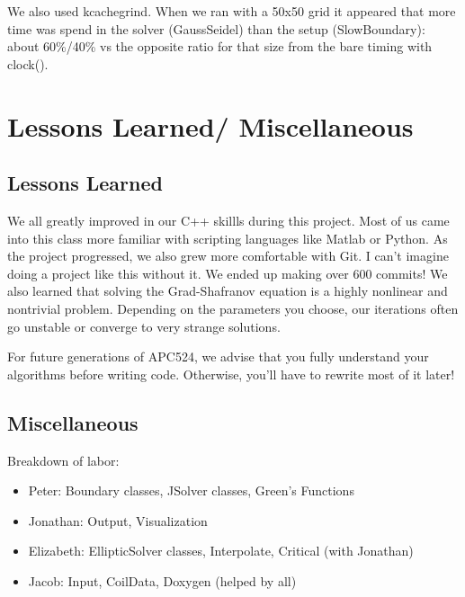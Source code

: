 \documentclass[paper=letter, fontsize=11pt]{scrartcl} %
\begin{document}
We also used kcachegrind. When we ran with a 50x50 grid it appeared that more time was spend in the solver (GaussSeidel) than the setup (SlowBoundary): about 60\%/40\% vs the opposite ratio for that size from the bare timing with clock(). 


\section{Lessons Learned/ Miscellaneous}
\subsection{Lessons Learned}

We all greatly improved in our C++ skillls during this project.  Most of us came into this class more familiar with scripting languages like Matlab or Python.  As the project progressed, we also grew more comfortable with Git.  I can't imagine doing a project like this without it.  We ended up making over 600 commits!  We also learned that solving the Grad-Shafranov equation is a highly nonlinear and nontrivial problem.  Depending on the parameters you choose, our iterations often go unstable or converge to very strange solutions.  

For future generations of APC524, we advise that you fully understand your algorithms before writing code.  Otherwise, you'll have to rewrite most of it later!  

\subsection{Miscellaneous}
Breakdown of labor:

\begin{itemize}
\item Peter: Boundary classes, JSolver classes, Green's Functions
\item Jonathan: Output, Visualization 
\item Elizabeth: EllipticSolver classes, Interpolate, Critical (with Jonathan)
\item Jacob: Input, CoilData, Doxygen (helped by all)
\end{itemize}
\end{document}
